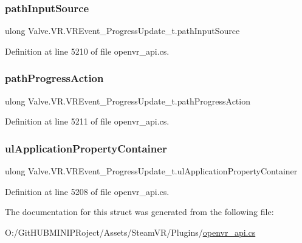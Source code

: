 \subsubsection{\texorpdfstring{pathInputSource}{pathInputSource}}
{\footnotesize\ttfamily ulong Valve.\+V\+R.\+V\+R\+Event\+\_\+\+Progress\+Update\+\_\+t.\+path\+Input\+Source}



Definition at line 5210 of file openvr\+\_\+api.\+cs.

\mbox{\label{struct_valve_1_1_v_r_1_1_v_r_event___progress_update__t_a4d2773b65e40c48bc5297863a2d2d555}} 
\subsubsection{\texorpdfstring{pathProgressAction}{pathProgressAction}}
{\footnotesize\ttfamily ulong Valve.\+V\+R.\+V\+R\+Event\+\_\+\+Progress\+Update\+\_\+t.\+path\+Progress\+Action}



Definition at line 5211 of file openvr\+\_\+api.\+cs.

\mbox{\label{struct_valve_1_1_v_r_1_1_v_r_event___progress_update__t_a32399aaa07f713f1569dca9010b000f2}} 
\subsubsection{\texorpdfstring{ulApplicationPropertyContainer}{ulApplicationPropertyContainer}}
{\footnotesize\ttfamily ulong Valve.\+V\+R.\+V\+R\+Event\+\_\+\+Progress\+Update\+\_\+t.\+ul\+Application\+Property\+Container}



Definition at line 5208 of file openvr\+\_\+api.\+cs.



The documentation for this struct was generated from the following file\+:\begin{DoxyCompactItemize}
\item 
O\+:/\+Git\+H\+U\+B\+M\+I\+N\+I\+P\+Roject/\+Assets/\+Steam\+V\+R/\+Plugins/\mbox{\hyperlink{openvr__api_8cs}{openvr\+\_\+api.\+cs}}\end{DoxyCompactItemize}
